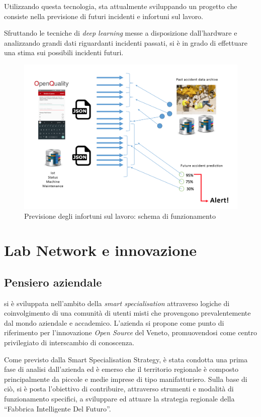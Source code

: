 Utilizzando questa tecnologia, \lab{} sta attualmente sviluppando un progetto che consiste nella previsione di futuri incidenti e infortuni sul lavoro.

Sfruttando le tecniche di \textit{deep learning} messe a disposizione dall'hardware e analizzando grandi dati riguardanti incidenti passati, si è in grado di effettuare una stima sui possibili incidenti futuri.
\begin{figure}[H]
	\begin{center}
	\includegraphics[scale=0.25]{immagini/accident_prediction.png}
	\caption{Previsione degli infortuni sul lavoro: schema di funzionamento}
	\end{center}
\end{figure}

\section{Lab Network e innovazione}
\subsection{Pensiero aziendale}
\lab{} si è sviluppata nell'ambito della \textit{smart specialisation} attraverso logiche di coinvolgimento di una comunità di utenti misti che provengono prevalentemente dal mondo aziendale e accademico. 
L'azienda si propone come punto di riferimento per l'innovazione \textit{Open Source} del Veneto, promuovendosi come centro privilegiato di interscambio di conoscenza.

Come previsto dalla Smart Specialisation Strategy, è stata condotta una prima fase di analisi dall'azienda ed è emerso che il territorio regionale è composto principalmente da piccole e medie imprese di tipo manifatturiero. Sulla base di ciò, \lab{} si è posta l'obiettivo di contribuire, attraverso strumenti e modalità di funzionamento specifici, a sviluppare ed attuare la strategia regionale della ``Fabbrica Intelligente Del Futuro''.

